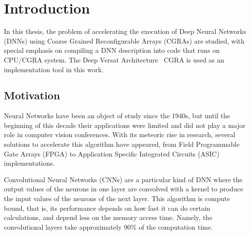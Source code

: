 
\chapter{Introduction}
\label{chapter:introduction}




In this thesis, the problem of accelerating the execution of Deep Neural
Networks (DNNs) using Coarse Grained Reconfigurable Arrays (CGRAs) are studied,
with special emphasis on compiling a DNN description into code that runs on
CPU/CGRA system. The Deep Versat Architecture~\cite{valter:deepversat} CGRA is used as an
implementation tool in this work.


\section{Motivation}
\label{section:motivation}

Neural Networks have been an object of study since the 1940s, but until the
beginning of this decade their applications were limited and did not play a
major role in computer vision conferences. With its meteoric rise in research,
several solutions to accelerate this algorithm have appeared, from Field Programmable Gate Arrays (FPGA) to
Application Specific Integrated Circuits (ASIC) implementations.

Convolutional Neural Networks (CNNs) are a particular kind of DNN where the output
values of the neurons in one layer are convolved with a kernel to produce the
input values of the neurons of the next layer. This algorithm is compute bound,
that is, its performance depends on how fast it can do certain calculations, and
depend less on the memory access time. Namely, the convolutional layers take
approximately 90$\%$ of the computation time.

